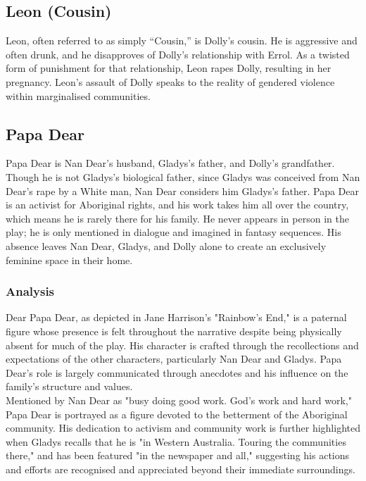 \documentclass[a4paper]{article}
\begin{document}
\subsection{Leon (Cousin)}
Leon, often referred to as simply “Cousin,” is
Dolly’s cousin. He is aggressive and often drunk, and he
disapproves of Dolly’s relationship with Errol. As a twisted
form of punishment for that relationship, Leon rapes Dolly,
resulting in her pregnancy. Leon’s assault of Dolly speaks to the
reality of gendered violence within marginalised communities.\\

\subsection{Papa Dear}
Papa Dear is Nan Dear’s husband, Gladys’s father,
and Dolly’s grandfather. Though he is not Gladys’s biological
father, since Gladys was conceived from Nan Dear’s rape by a
White man, Nan Dear considers him Gladys’s father. Papa Dear
is an activist for Aboriginal rights, and his work takes him all
over the country, which means he is rarely there for his family.
He never appears in person in the play; he is only mentioned in
dialogue and imagined in fantasy sequences. His absence
leaves Nan Dear, Gladys, and Dolly alone to create an
exclusively feminine space in their home.\\

\subsubsection{Analysis}
Dear
Papa Dear, as depicted in Jane Harrison's "Rainbow's End," is a paternal figure whose presence is 
felt throughout the narrative despite being physically absent for much of the play. His character 
is crafted through the recollections and expectations of the other characters, particularly Nan 
Dear and Gladys. Papa Dear's role is largely communicated through anecdotes and his influence on 
the family's structure and values.\\

Mentioned by Nan Dear as "busy doing good work. God’s work and hard work," Papa Dear is portrayed 
as a figure devoted to the betterment of the Aboriginal community. His dedication to activism and 
community work is further highlighted when Gladys recalls that he is "in Western Australia. Touring 
the communities there," and has been featured "in the newspaper and all," suggesting his actions 
and efforts are recognised and appreciated beyond their immediate surroundings.\\
\end{document}
